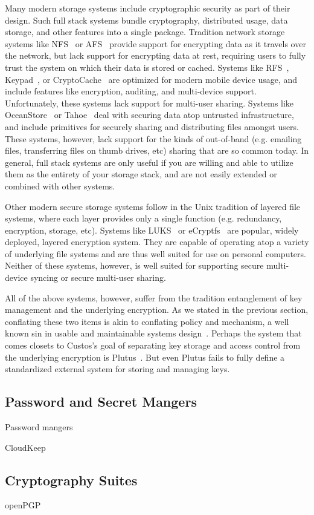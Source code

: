 Many modern storage systems include cryptographic security as part of
their design. Such full stack systems bundle cryptography, distributed
usage, data storage, and other features into a single
package. Tradition network storage systems like
NFS~\cite{Sandberg1985} or AFS~\cite{Howard1988} provide support for
encrypting data as it travels over the network, but lack support for
encrypting data at rest, requiring users to fully trust the system on
which their data is stored or cached. Systems like
RFS~\cite{Dong2011}, Keypad~\cite{Geambasu2011}, or
CryptoCache~\cite{Jensen2000} are optimized for modern mobile device
usage, and include features like encryption, auditing, and
multi-device support. Unfortunately, these systems lack support for
multi-user sharing. Systems like OceanStore~\cite{Kubiatowicz2000} or
Tahoe~\cite{Wilcox-O'Hearn2008} deal with securing data atop untrusted
infrastructure, and include primitives for securely sharing and
distributing files amongst users. These systems, however, lack support
for the kinds of out-of-band (e.g. emailing files, transferring files
on thumb drives, etc) sharing that are so common today. In general,
full stack systems are only useful if you are willing and able to
utilize them as the entirety of your storage stack, and are not easily
extended or combined with other systems.

Other modern secure storage systems follow in the Unix tradition of
layered file systems, where each layer provides only a single function
(e.g. redundancy, encryption, storage, etc). Systems like
LUKS~\cite{luks} or eCryptfs~\cite{eCryptfs, Halcrow} are popular,
widely deployed, layered encryption system. They are capable of
operating atop a variety of underlying file systems and are thus well
suited for use on personal computers. Neither of these systems,
however, is well suited for supporting secure multi-device syncing or
secure multi-user sharing.

All of the above systems, however, suffer from the tradition
entanglement of key management and the underlying encryption. As we
stated in the previous section, conflating these two items is akin to
conflating policy and mechanism, a well known sin in usable and
maintainable systems design~\cite{Wulf1974}. Perhaps the system that
comes closets to Custos's goal of separating key storage and access
control from the underlying encryption is
Plutus~\cite{Kallahalla2003}. But even Plutus fails to fully define a
standardized external system for storing and managing keys.

\subsection{Password and Secret Mangers}

Password mangers

CloudKeep~\cite{cloudkeep-presentation}

\subsection{Cryptography Suites}

openPGP
